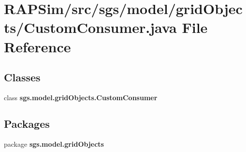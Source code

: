 \section{R\-A\-P\-Sim/src/sgs/model/grid\-Objects/\-Custom\-Consumer.java File Reference}
\label{_custom_consumer_8java}
\subsection*{Classes}
\begin{DoxyCompactItemize}
\item 
class {\bf sgs.\-model.\-grid\-Objects.\-Custom\-Consumer}
\end{DoxyCompactItemize}
\subsection*{Packages}
\begin{DoxyCompactItemize}
\item 
package {\bf sgs.\-model.\-grid\-Objects}
\end{DoxyCompactItemize}
